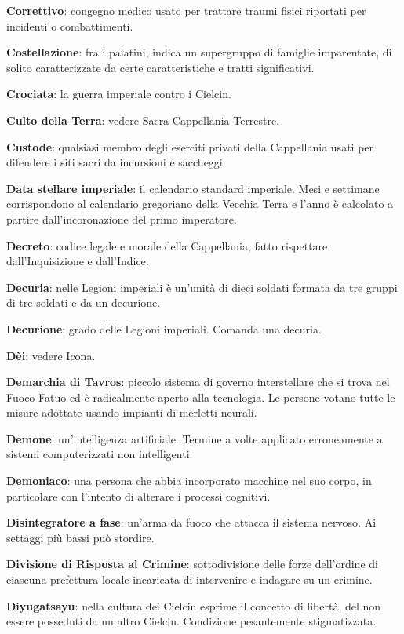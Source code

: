 \textbf{Correttivo}: congegno medico usato per trattare traumi fisici
riportati per incidenti o combattimenti.

\textbf{Costellazione}: fra i palatini, indica un supergruppo di
famiglie imparentate, di solito caratterizzate da certe caratteristiche
e tratti significativi.

\textbf{Crociata}: la guerra imperiale contro i Cielcin.

\textbf{Culto della Terra}: vedere Sacra Cappellania Terrestre.

\textbf{Custode}: qualsiasi membro degli eserciti privati della
Cappellania usati per difendere i siti sacri da incursioni e saccheggi.

\textbf{Data stellare imperiale}: il calendario standard imperiale. Mesi
e settimane corrispondono al calendario gregoriano della Vecchia Terra e
l'anno è calcolato a partire dall'incoronazione del primo imperatore.

\textbf{Decreto}: codice legale e morale della Cappellania, fatto
rispettare dall'Inquisizione e dall'Indice.

\textbf{Decuria}: nelle Legioni imperiali è un'unità di dieci soldati
formata da tre gruppi di tre soldati e da un decurione.

\textbf{Decurione}: grado delle Legioni imperiali. Comanda una decuria.

\textbf{Dèi}: vedere Icona.

\textbf{Demarchia di Tavros}: piccolo sistema di governo interstellare
che si trova nel Fuoco Fatuo ed è radicalmente aperto alla tecnologia.
Le persone votano tutte le misure adottate usando impianti di merletti
neurali.

\textbf{Demone}: un'intelligenza artificiale. Termine a volte applicato
erroneamente a sistemi computerizzati non intelligenti.

\textbf{Demoniaco}: una persona che abbia incorporato macchine nel suo
corpo, in particolare con l'intento di alterare i processi cognitivi.

\textbf{Disintegratore a fase}: un'arma da fuoco che attacca il sistema
nervoso. Ai settaggi più bassi può stordire.

\textbf{Divisione di Risposta al Crimine}: sottodivisione delle forze
dell'ordine di ciascuna prefettura locale incaricata di intervenire e
indagare su un crimine.

\textbf{Diyugatsayu}: nella cultura dei Cielcin esprime il concetto di
libertà, del non essere posseduti da un altro Cielcin. Condizione
pesantemente stigmatizzata.

